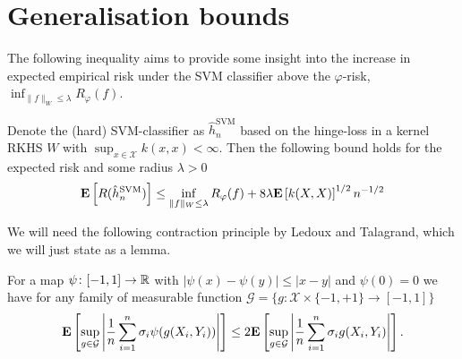 \section{Generalisation bounds}
The following inequality aims to provide some insight into the increase in expected empirical risk under the SVM classifier above the $\varphi$-risk, $\inf_{\|f\|_W\leq \lambda} R_\varphi(f)$.

\begin{theorem}\label{eq:excess_risk}
Denote the (hard) SVM-classifier as $\hat{h}_n^\mathrm{SVM}$ based on the hinge-loss in a kernel RKHS $W$ with $\sup_{x \in \mathcal{X}} k(x, x) < \infty$. Then the following bound holds for the expected risk and some radius $\lambda> 0$
\begin{equation*}
	\mathbf{E}\left[R(\hat{h}_n^\mathrm{SVM})\right] \leq \inf_{\|f\|_W\leq \lambda} R_\varphi(f) + 8 \lambda\mathbf{E}\left[k(X, X)\right]^{1/2}n^{-1/2}
\end{equation*}
\end{theorem}

We will need the following contraction principle by Ledoux and Talagrand, which we will just state as a lemma.
\begin{lemma}\label{lemma:contraction}
For a map $\psi\colon [-1, 1] \rightarrow \mathbb{R}$ with $|\psi(x) - \psi(y)|\leq | x- y|$ and $\psi(0) = 0$ we have for any family of measurable function $\mathcal{G} = \{g: \mathcal{X} \times \{-1, +1\} \rightarrow [-1, 1]\}$
\begin{equation*}
	\mathbf{E}\left[\sup_{g\in \mathcal{G}}\left|\frac{1}{n}\sum_{i=1}^n\sigma_i\psi(g(X_i, Y_i))\right|\right] \leq 2\mathbf{E}\left[\sup_{g\in \mathcal{G}}\left|\frac{1}{n}\sum_{i=1}^n\sigma_ig(X_i, Y_i)\right|\right].
\end{equation*}
\end{lemma}

